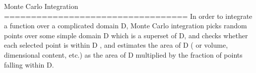 Monte Carlo Integration
================================== 
In order to integrate a function over a complicated domain D, Monte Carlo integration picks random points over some simple domain D  which is a superset of D,  and checks whether each selected point is within D , and estimates the area of D ( or volume, dimensional content, etc.) as the area of D multiplied by the fraction of points falling within  D.
